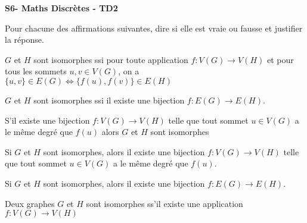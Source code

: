 \documentclass[french]{report}
\begin{document}
\begin{center}
    \huge{\textbf{S6- Maths Discrètes - TD2}}
\end{center}

\begin{exo}
    Pour chacune des affirmations suivantes, dire si elle est vraie ou fausse
    et justifier la réponse.
    \begin{q}{1}
        \(G\) et \(H\) sont isomorphes ssi pour toute application \(f:V(G)\to V(H)\)
        et pour tous les sommets \(u,v\in V(G)\), on a \(\{u,v\}\in E(G)
        \Leftrightarrow\{f(u),f(v)\}\in E(H)\)
    \end{q}
    \begin{q}{2}
        \(G\) et \(H\) sont isomorphes ssi il existe une bijection \(f:E(G)\to E(H)\).
    \end{q}
    \begin{q}{3}
        S'il existe une bijection \(f:V(G)\to V(H)\) telle que tout sommet \(u\in V(G)\)
        a le même degré que \(f(u)\) alors \(G\) et \(H\) sont isomorphes
    \end{q}
    \begin{q}{4}
        Si \(G\) et \(H\) sont isomorphes, alors il existe une bijection \(f:V(G)\to V(H)\)
        telle que tout sommet \(u\in V(G)\) a le même degré que \(f(u)\).
    \end{q}
    \begin{q}{5}
        Si \(G\) et \(H\) sont isomorphes, alors il existe une bijection \(f:E(G)\to E(H)\).
    \end{q}
    \begin{q}{6}
        Deux graphes \(G\) et \(H\) sont isomorphes ss'il existe une application \(f:V(G)\to V(H)\)

\end{q}
\end{exo}
\end{document}
